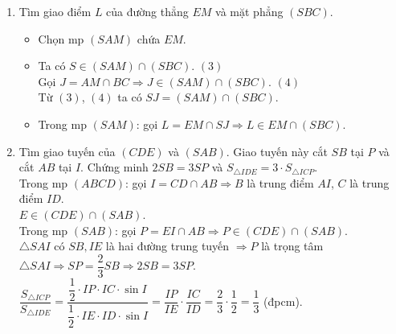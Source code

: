 \begin{bt}
{\begin{enumerate}
{{
				}
			}
			\item Tìm giao điểm $L$ của đường thẳng $EM$ và mặt phẳng $(SBC)$.
			\begin{itemize}
				\item Chọn mp $(SAM)$ chứa $EM$.
				\item Ta có $S\in (SAM)\cap (SBC)$. \quad $(3)$\\
				Gọi $J=AM\cap BC \Rightarrow J\in (SAM)\cap (SBC)$. \quad $(4)$\\
				Từ $(3)$, $(4)$ ta có $SJ=(SAM)\cap (SBC)$.
				\item Trong mp $(SAM)$: gọi $L=EM\cap SJ \Rightarrow L\in EM\cap (SBC)$.	
			\end{itemize}
			\item Tìm giao tuyến của $(CDE)$ và $(SAB)$. Giao tuyến này cắt $SB$ tại $P$ và cắt $AB$ tại $I$. Chứng minh $2SB=3SP$ và $S_{\triangle IDE}=3\cdot S_{\triangle ICP}$.\\
			Trong mp $(ABCD)$: gọi $I=CD\cap AB \Rightarrow B$ là trung điểm $AI$, $C$ là trung điểm $ID$.\\
			$E\in (CDE)\cap (SAB)$.\\
			Trong mp $(SAB)$: gọi $P=EI\cap AB \Rightarrow P\in (CDE)\cap (SAB)$.\\
			$\triangle SAI$ có $SB, IE$ là hai đường trung tuyến $ \Rightarrow P$ là trọng tâm $\triangle SAI \Rightarrow SP=\dfrac{2}{3}SB \Rightarrow 2SB=3SP$.\\
			$\dfrac{S_{\triangle ICP}}{S_{\triangle IDE}}=\dfrac{\dfrac{1}{2}\cdot IP\cdot IC\cdot\sin I}{\dfrac{1}{2}\cdot IE\cdot ID\cdot\sin I}=\dfrac{IP}{IE}\cdot\dfrac{IC}{ID}=\dfrac{2}{3}\cdot\dfrac{1}{2}=\dfrac{1}{3}$ (đpcm).	
		\end{enumerate}
	}
\end{bt}

